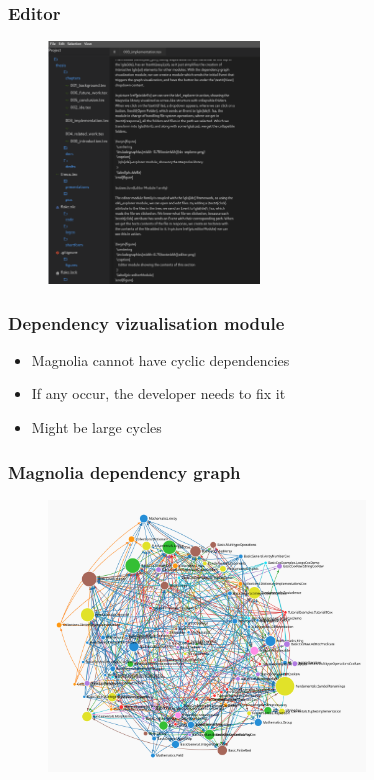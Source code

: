 \begin{frame}
  \frametitle{Editor}
  \begin{figure}
    \centering
    \includegraphics[width=0.5\textwidth]{./pics/editor.png}
  \end{figure}
\end{frame}

\begin{frame}
  \frametitle{Dependency vizualisation module}
  \begin{itemize}
    \item Magnolia cannot have cyclic dependencies
    \item If any occur, the developer needs to fix it
    \item Might be large cycles
  \end{itemize}
\end{frame}

\begin{frame}
  \frametitle{Magnolia dependency graph}
  \begin{figure}
    \centering
    \includegraphics[width=0.75\textwidth]{./pics/magnolia-dependencies.png}
  \end{figure}
\end{frame}

